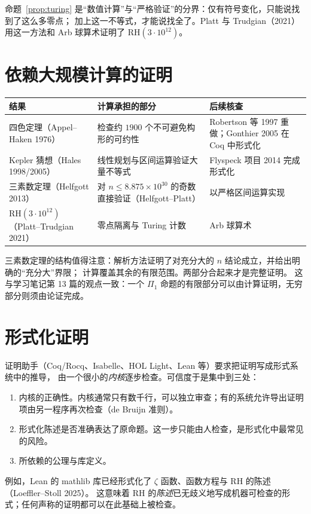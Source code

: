 \documentclass[11pt]{article}
\begin{document}
\medskip
命题~\ref{prop:turing} 是“数值计算”与“严格验证”的分界：仅有符号变化，只能说找到了这么多零点；
加上这一不等式，才能说找全了。Platt 与 Trudgian（2021）用这一方法和 Arb 球算术证明了 $\mathrm{RH}(3\cdot10^{12})$。

\section{依赖大规模计算的证明}
\begin{center}
\small
\renewcommand{\arraystretch}{1.25}
\begin{tabular}{>{\raggedright\arraybackslash}p{}>{\raggedright\arraybackslash}p{}>{\raggedright\arraybackslash}p{}}
\toprule
结果 & 计算承担的部分 & 后续核查\\
\midrule
四色定理（Appel--Haken 1976） & 检查约 $1900$ 个不可避免构形的可约性 & Robertson 等 1997 重做；Gonthier 2005 在 Coq 中形式化\\
Kepler 猜想（Hales 1998/2005） & 线性规划与区间运算验证大量不等式 & Flyspeck 项目 2014 完成形式化\\
三素数定理（Helfgott 2013） & 对 $n\le8.875\times10^{30}$ 的奇数直接验证（Helfgott--Platt） & 以严格区间运算实现\\
$\mathrm{RH}(3\cdot10^{12})$（Platt--Trudgian 2021） & 零点隔离与 Turing 计数 & Arb 球算术\\
\bottomrule
\end{tabular}
\end{center}
三素数定理的结构值得注意：解析方法证明了对充分大的 $n$ 结论成立，并给出明确的“充分大”界限；
计算覆盖其余的有限范围。两部分合起来才是完整证明。
这与学习笔记第 13 篇的观点一致：一个 $\Pi_1$ 命题的有限部分可以由计算证明，无穷部分则须由论证完成。

\section{形式化证明}
证明助手（Coq/Rocq、Isabelle、HOL Light、Lean 等）要求把证明写成形式系统中的推导，
由一个很小的\emph{内核}逐步检查。可信度于是集中到三处：
\begin{enumerate}
 \item 内核的正确性。内核通常只有数千行，可以独立审查；有的系统允许导出证明项由另一程序再次检查（de Bruijn 准则）。
 \item 形式化陈述是否准确表达了原命题。这一步只能由人检查，是形式化中最常见的风险。
 \item 所依赖的公理与库定义。
\end{enumerate}
例如，Lean 的 mathlib 库已经形式化了 $\zeta$ 函数、函数方程与 RH 的陈述（Loeffler--Stoll 2025）。
这意味着 RH 的\emph{陈述}已无歧义地写成机器可检查的形式；任何声称的证明都可以在此基础上被检查。
\end{document}

